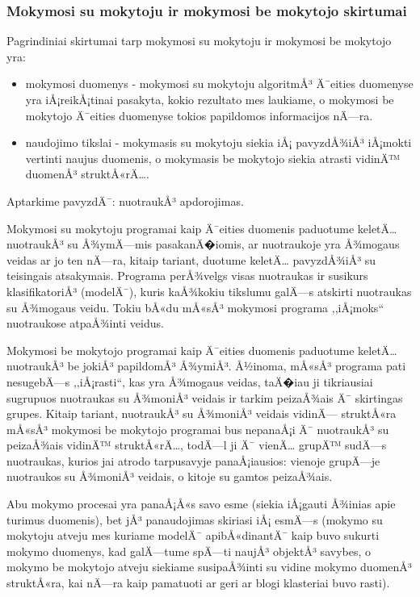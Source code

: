 
\subsubsection{Mokymosi su mokytoju ir mokymosi be mokytojo skirtumai}

Pagrindiniai skirtumai tarp mokymosi su mokytoju ir mokymosi be mokytojo yra:
\begin{itemize}
	\item mokymosi duomenys - mokymosi su mokytoju algoritmÅ³ Ä¯eities duomenyse
	yra	iÅ¡reikÅ¡tinai pasakyta, kokio rezultato mes laukiame, o mokymosi be
	mokytojo Ä¯eities duomenyse tokios papildomos informacijos nÄ—ra.
	\item  naudojimo tikslai - mokymasis su mokytoju siekia iÅ¡ pavyzdÅ¾iÅ³
	iÅ¡mokti vertinti naujus duomenis, o mokymasis be mokytojo siekia atrasti
	vidinÄ™ duomenÅ³ struktÅ«rÄ….
\end{itemize}

Aptarkime pavyzdÄ¯: nuotraukÅ³ apdorojimas.

Mokymosi su mokytoju programai kaip Ä¯eities duomenis paduotume keletÄ… 
nuotraukÅ³ su Å¾ymÄ—mis pasakanÄ�iomis, ar nuotraukoje yra Å¾mogaus veidas ar jo ten
nÄ—ra, kitaip tariant, duotume keletÄ… pavyzdÅ¾iÅ³ su teisingais atsakymais.
Programa perÅ¾velgs visas nuotraukas ir susikurs klasifikatoriÅ³ (modelÄ¯), kuris
kaÅ¾kokiu tikslumu galÄ—s atskirti nuotraukas su Å¾mogaus veidu. Tokiu bÅ«du mÅ«sÅ³
mokymosi programa ,,iÅ¡moks`` nuotraukose atpaÅ¾inti veidus.

Mokymosi be mokytojo programai kaip Ä¯eities duomenis paduotume keletÄ…
nuotraukÅ³ be jokiÅ³ papildomÅ³ Å¾ymiÅ³. Å½inoma, mÅ«sÅ³ programa pati nesugebÄ—s
,,iÅ¡rasti``, kas yra Å¾mogaus veidas, taÄ�iau ji tikriausiai sugrupuos nuotraukas
su Å¾moniÅ³ veidais ir tarkim peizaÅ¾ais Ä¯ skirtingas grupes. Kitaip tariant,
nuotraukÅ³ su Å¾moniÅ³ veidais vidinÄ— struktÅ«ra mÅ«sÅ³ mokymosi be mokytojo programai
bus nepanaÅ¡i Ä¯ nuotraukÅ³ su peizaÅ¾ais vidinÄ™ struktÅ«rÄ…, todÄ—l ji Ä¯ vienÄ… grupÄ™
sudÄ—s nuotraukas, kurios jai atrodo tarpusavyje panaÅ¡iausios: vienoje
grupÄ—je nuotraukos su Å¾moniÅ³ veidais, o kitoje su gamtos peizaÅ¾ais.

Abu mokymo procesai yra panaÅ¡Å«s savo esme (siekia iÅ¡gauti Å¾inias apie turimus
duomenis), bet jÅ³ panaudojimas skiriasi iÅ¡ esmÄ—s (mokymo su mokytoju atveju mes
kuriame modelÄ¯ apibÅ«dinantÄ¯ kaip buvo sukurti mokymo duomenys, kad galÄ—tume
spÄ—ti naujÅ³ objektÅ³ savybes, o mokymo be mokytojo atveju siekiame susipaÅ¾inti
su vidine mokymo duomenÅ³ struktÅ«ra, kai nÄ—ra kaip pamatuoti ar geri ar blogi
klasteriai buvo rasti).

